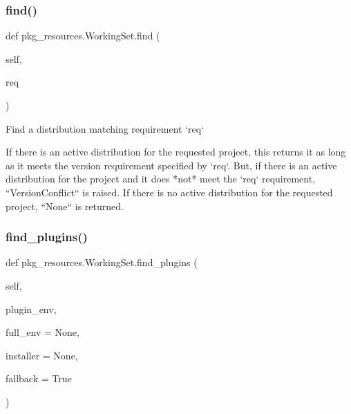 \subsubsection{\texorpdfstring{find()}{find()}}
{\footnotesize\ttfamily def pkg\+\_\+resources.\+Working\+Set.\+find (\begin{DoxyParamCaption}\item[{}]{self,  }\item[{}]{req }\end{DoxyParamCaption})}

\begin{DoxyVerb}Find a distribution matching requirement `req`

If there is an active distribution for the requested project, this
returns it as long as it meets the version requirement specified by
`req`.  But, if there is an active distribution for the project and it
does *not* meet the `req` requirement, ``VersionConflict`` is raised.
If there is no active distribution for the requested project, ``None``
is returned.
\end{DoxyVerb}
 \mbox{\label{classpkg__resources_1_1WorkingSet_a5a8cbb91286691870d04edd6c841197d}} 
\subsubsection{\texorpdfstring{find\+\_\+plugins()}{find\_plugins()}}
{\footnotesize\ttfamily def pkg\+\_\+resources.\+Working\+Set.\+find\+\_\+plugins (\begin{DoxyParamCaption}\item[{}]{self,  }\item[{}]{plugin\+\_\+env,  }\item[{}]{full\+\_\+env = {\ttfamily None},  }\item[{}]{installer = {\ttfamily None},  }\item[{}]{fallback = {\ttfamily True} }\end{DoxyParamCaption})}

